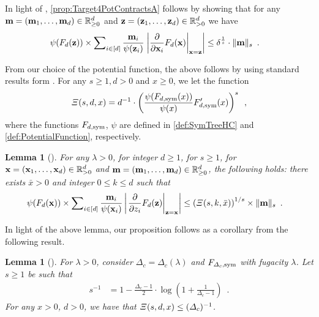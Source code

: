 \documentclass[11pt,reqno]{amsart}
\numberwithin{equation}{section}
\newtheorem{lemma}[theorem]{Lemma}
\newcommand{\bluepigment}[1]{{\color{blue(pigment)}#1}}
\newcommand{\capri}[1]{{\color{capri}#1}}
\newcommand{\cadmiumgreen}[1]{{\color{cadmiumgreen}#1}}
\newcommand{\darkmagenta}[1]{{\color{darkmagenta}#1}}
\newcommand{\goldenbrown}[1]{{\color{goldenbrown}#1}}
\newcommand{\heliotrope}[1]{{\color{heliotrope}#1}}
\newcommand{\dcritical}{{\Delta_c}}
\newcommand{\dpotF}{{\psi}}
\newcommand{\pfs}{\darkmagenta{s}}
\newcommand{\trecur}{F}
\newcommand{\norm}[2]{\goldenbrown{\|} #1 \goldenbrown{\|}_{#2}}
\renewcommand{\bluepigment}[1]{#1}
\renewcommand{\capri}[1]{#1}
\renewcommand{\cadmiumgreen}[1]{#1}
\renewcommand{\darkmagenta}[1]{#1}
\renewcommand{\goldenbrown}[1]{#1}
\renewcommand{\heliotrope}[1]{#1}
\newcommand{\ki}{\capri{i}}
\newcommand{\kk}{\bluepigment{k}}
\newcommand{\kx}{\heliotrope{x}}
\newcommand{\kz}{\cadmiumgreen{z}}
\renewcommand{\ki}{i}
\renewcommand{\kk}{k}
\renewcommand{\kx}{x}
\renewcommand{\kz}{z}
\begin{document}
In light of , \eqref{prop:Target4PotContractsA} follows by showing that
for any ${\bf m}=({\bf m}_1, \ldots, {\bf m}_d) \in \mathbb{R}^{d}_{ \geq 0}$ and 
${\bf \kz}=({\bf \kz}_1, \ldots, {\bf \kz}_d)\in \mathbb{R}^{d}_{>0}$ we have 
\begin{align}\label{prop:Target4PotContractsB}
\dpotF (\trecur_{d}({\bf \kz})) \times \sum\nolimits_{i\in [d]} \frac{{\bf m}_i }{\dpotF({\bf \kz}_i)} \left . 
\left| \frac{\partial }{\partial {\bf \kx}_i}\trecur_{d}({\bf \kx}) \right|_{{\bf \kx} ={\bf \kz}}\right|
%
& \leq \delta^{\frac{1}{s}} \cdot \norm{ {\bf m}}{\pfs} \enspace. 
\end{align}

\noindent 
From our choice of the potential function, the above follows by using standard results form \cite{ConnectiveConst}. 
%
%
For any $s\geq 1, d>0$ and $x\geq 0$, we let the function
\begin{align} \nonumber 
\HCFactor(s, d, x)=d^{-1}\cdot \left( \frac{\dpotF(\trecur_{d,{\rm sym}}(x))}{\dpotF(x)} \trecur'_{d,{\rm sym}}(x) \right)^s \enspace,
\end{align}
where the functions $\trecur_{d,{\rm sym}}$, $\dpotF$ are defined in \eqref{def:SymTreeHC} and \eqref{def:PotentialFunction}, 
respectively. %

\begin{lemma}[\cite{ConnectiveConst}]\label{lemma:InsteadOfHolder}
For any $\lambda>0$, for integer $d\geq 1$, for $s\geq 1$, for ${\bf \kx}=({\bf \kx}_1, \ldots, {\bf \kx}_d) \in \mathbb{R}^d_{>0}$ 
and ${\bf m}=({\bf m}_1, \ldots, {\bf m}_d)\in \mathbb{R}^d_{\geq 0}$, the following holds: 
there exists $\bar{\kx}>0$ and integer $0\leq \kk\leq d$ such that 
\begin{align}\nonumber
\dpotF (\trecur_d({\bf \kx})) \times \sum\nolimits_{\ki\in [d]} \frac{{\bf m}_i }{\dpotF({\bf \kx}_i)} 
\left| \left . \frac{\partial }{\partial \kz_i}\trecur_d({\bf \kz}) \right|_{{\bf \kz} ={\bf \kx}} \right|
& \leq \left( \HCFactor(s, k, \bar{x}) \right)^{1/s} \times \norm{ {\bf m}}{s} \enspace.
\end{align}
\end{lemma}
%
In light of the above lemma, our proposition follows as a corollary from the following result.

\begin{lemma}[\cite{ConnectiveConst}] \label{lemma:XiBoundAtFixPoint}
For $\lambda>0$, consider $\dcritical=\dcritical(\lambda)$ and $\trecur_{\dcritical, {\rm sym}}$ with fugacity $\lambda$.
Let $\pfs\geq 1$ be such that
{\small 
\begin{align}\nonumber
\pfs^{-1}&= 1-{\textstyle \frac{\dcritical-1}{2}}\cdot \log\left(1+{\textstyle \frac{1}{\dcritical-1}} \right) \enspace.
\end{align}
}
For any $x> 0$, $d> 0$, we have that $\HCFactor(\pfs,d,x) \leq (\dcritical)^{-1}$.
\end{lemma}
\end{document}
